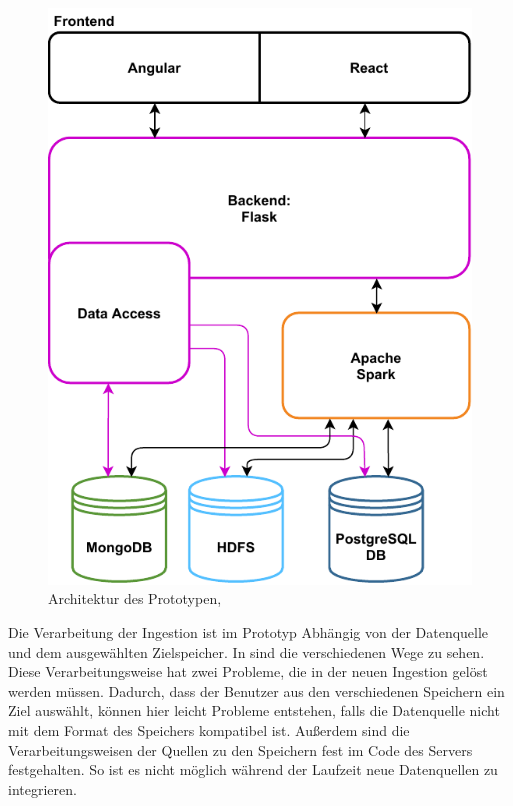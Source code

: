 \begin{figure}
    \centering
    \includegraphics{Grafiken/data_lake_prototype_arch.pdf}
    \caption{Architektur des Prototypen, }
    \label{fig:prototyp-architektur}
\end{figure}

Die Verarbeitung der Ingestion ist im Prototyp Abhängig von der Datenquelle und dem ausgewählten Zielspeicher.
In  sind die verschiedenen Wege zu sehen.
Diese Verarbeitungsweise hat zwei Probleme, die in der neuen Ingestion gelöst werden müssen.
Dadurch, dass der Benutzer aus den verschiedenen Speichern ein Ziel auswählt, können hier leicht Probleme entstehen, falls die Datenquelle nicht mit dem Format des Speichers kompatibel ist.
Außerdem sind die Verarbeitungsweisen der Quellen zu den Speichern fest im Code des Servers festgehalten.
So ist es nicht möglich während der Laufzeit neue Datenquellen zu integrieren.

